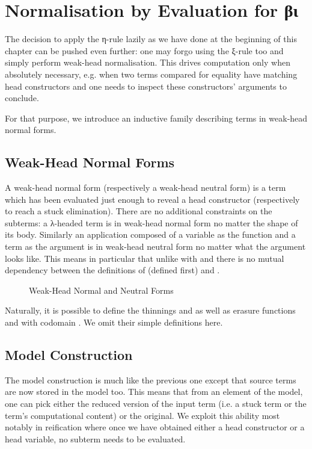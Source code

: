 \section{Normalisation by Evaluation for βι}

The decision to apply the η-rule lazily as we have done at the beginning of
this chapter can be pushed even further: one may forgo using the ξ-rule too
and simply perform weak-head normalisation. This drives computation only when
absolutely necessary, e.g. when two terms compared for equality have matching
head constructors and one needs to inspect these constructors' arguments to
conclude.

For that purpose, we introduce an inductive family describing terms in
weak-head normal forms.

\subsection{Weak-Head Normal Forms}

A weak-head normal form (respectively a weak-head neutral form) is a term
which has been evaluated just enough to reveal a head constructor
(respectively to reach a stuck elimination). There are no additional
constraints on the subterms: a λ-headed term is in weak-head normal form
no matter the shape of its body. Similarly an application composed of a
variable as the function and a term as the argument is in weak-head neutral
form no matter what the argument looks like. This means in particular
that unlike with  and  there is no mutual dependency between
the definitions of  (defined first) and .

\begin{figure}[h]
\caption{Weak-Head Normal and Neutral Forms\label{fig:weakhead}}
\end{figure}

Naturally, it is possible to define the thinnings
 and 
as well as erasure
functions  and 
with codomain . We omit their simple definitions here.

\subsection{Model Construction}

The model construction is much like the previous one except
that source terms are now stored in the model too. This means that
from an element of the model, one can pick either the reduced version
of the input term (i.e. a stuck term or the term's computational
content) or the original. We exploit this ability most
notably in reification where once we have obtained either a
head constructor or a head variable, no subterm needs to
be evaluated.

